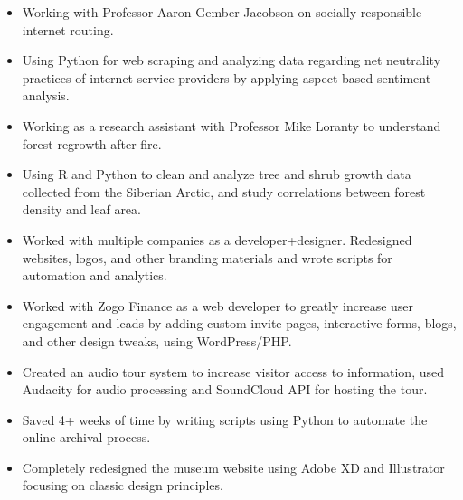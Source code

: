 \documentclass[a4paper]{resume}
\begin{document}
\begin{itemize} \vspace{-5pt} \itemsep -2pt
	\item Working with Professor Aaron Gember-Jacobson on socially responsible internet routing.
	\item Using Python for web scraping and analyzing data regarding net neutrality practices of internet service providers by applying aspect based sentiment analysis.	
\end{itemize}
\enresubsection
{}
\begin{itemize} \vspace{-5pt} \itemsep -2pt
	\item Working as a research assistant with Professor Mike Loranty to understand forest regrowth after fire. 
	\item Using R and Python to clean and analyze tree and shrub growth data collected from the Siberian Arctic, and study correlations between forest density and leaf area.
\end{itemize}
\enresubsection
{}
\begin{itemize} \vspace{-5pt} \itemsep -2pt
	\item Worked with multiple companies as a developer+designer. Redesigned websites, logos, and other branding materials and wrote scripts for automation and analytics.
	\item Worked with Zogo Finance as a web developer to greatly increase user engagement and leads by adding custom invite pages, interactive forms, blogs, and other design tweaks, using WordPress/PHP.
\end{itemize}
\enresubsection
{}
\begin{itemize} \vspace{-5pt} \itemsep -2pt
	\item Created an audio tour system to increase visitor access to information, used Audacity for audio processing and SoundCloud API for hosting the tour.
	\item Saved 4+ weeks of time by writing scripts using Python to automate the online archival process.
	\item Completely redesigned the museum website using Adobe XD and Illustrator focusing on classic design principles.
\end{itemize}
\end{document}
